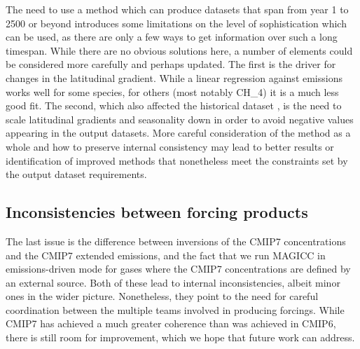 The need to use a method which can produce datasets that span from year 1 to 2500 or beyond
introduces some limitations on the level of sophistication which can be used,
as there are only a few ways to get information over such a long timespan.
While there are no obvious solutions here, a number of elements could be considered more carefully and perhaps updated.
The first is the driver for changes in the latitudinal gradient.
While a linear regression against emissions works well for some species,
for others (most notably CH_4) it is a much less good fit.
The second, which also affected the historical dataset \citep{nicholls_historical-ghgs_2026}, is the need to scale latitudinal gradients and seasonality down
in order to avoid negative values appearing in the output datasets.
More careful consideration of the method as a whole
and how to preserve internal consistency
may lead to better results or identification of improved methods
that nonetheless meet the constraints set by the output dataset requirements.

\subsection{Inconsistencies between forcing products}
\label{ssec:discussion-inconsistencies-forcing-products}

The last issue is the difference between inversions of the CMIP7 concentrations and the CMIP7 extended emissions,
and the fact that we run MAGICC in emissions-driven mode for gases where the CMIP7 concentrations are defined by an external source.
Both of these lead to internal inconsistencies, albeit minor ones in the wider picture.
Nonetheless, they point to the need for careful coordination between the multiple teams involved in producing forcings.
While CMIP7 has achieved a much greater coherence than was achieved in CMIP6,
there is still room for improvement, which we hope that future work can address.
